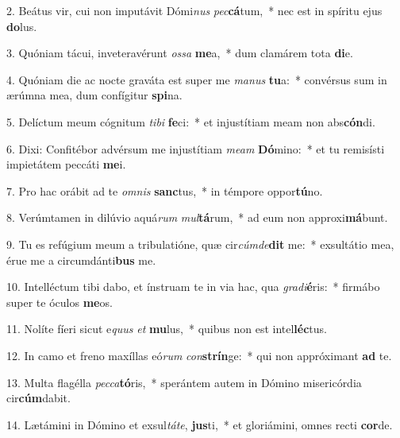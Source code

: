2. Beátus vir, cui non imputávit Dómi\textit{nus} \textit{pec}\textbf{cá}tum,~*  nec est in spíritu ejus \textbf{do}lus.\

3. Quóniam tácui, inveteravérunt \textit{os}\textit{sa} \textbf{me}a,~*  dum clamárem tota \textbf{di}e.\

4. Quóniam die ac nocte graváta est super me \textit{ma}\textit{nus} \textbf{tu}a:~*  convérsus sum in ærúmna mea, dum confígitur \textbf{spi}na.\

5. Delíctum meum cógnitum \textit{ti}\textit{bi} \textbf{fe}ci:~*  et injustítiam meam non abs\textbf{cón}di.\

6. Dixi: Confitébor advérsum me injustítiam \textit{me}\textit{am} \textbf{Dó}mino:~*  et tu remisísti impietátem peccáti \textbf{me}i.\

7. Pro hac orábit ad te \textit{om}\textit{nis} \textbf{sanc}tus,~*  in témpore oppor\textbf{tú}no.\

8. Verúmtamen in dilúvio aquá\textit{rum} \textit{mul}\textbf{tá}rum,~*  ad eum non approxi\textbf{má}bunt.\

9. Tu es refúgium meum a tribulatióne, quæ cir\textit{cúm}\textit{de}\textbf{dit} me:~*  exsultátio mea, érue me a circumdánti\textbf{bus} me.\

10. Intelléctum tibi dabo, et ínstruam te in via hac, qua \textit{gra}\textit{di}\textbf{é}ris:~*  firmábo super te óculos \textbf{me}os.\

11. Nolíte fíeri sicut e\textit{quus} \textit{et} \textbf{mu}lus,~*  quibus non est intel\textbf{léc}tus.\

12. In camo et freno maxíllas eó\textit{rum} \textit{con}\textbf{strín}ge:~*  qui non appróximant \textbf{ad} te.\

13. Multa flagélla \textit{pec}\textit{ca}\textbf{tó}ris,~*  sperántem autem in Dómino misericórdia cir\textbf{cúm}dabit.\

14. Lætámini in Dómino et exsul\textit{tá}\textit{te}, \textbf{jus}ti,~*  et gloriámini, omnes recti \textbf{cor}de.\

